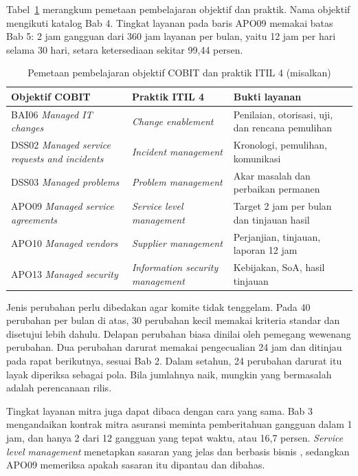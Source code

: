 Tabel~\ref{tab:ch08-itil} merangkum pemetaan pembelajaran objektif dan praktik. Nama objektif
mengikuti katalog Bab 4. Tingkat layanan pada baris APO09 memakai batas Bab 5: 2 jam gangguan dari
360 jam layanan per bulan, yaitu 12 jam per hari selama 30 hari, setara ketersediaan sekitar 99,44
persen.

\begin{table}[!htb]
  \centering\small
  \caption{Pemetaan pembelajaran objektif COBIT dan praktik ITIL 4 (misalkan)}\label{tab:ch08-itil}
  \begin{tabularx}{\textwidth}{|>{\raggedright\arraybackslash}p{}|>{\raggedright\arraybackslash}p{}|>{\raggedright\arraybackslash}X|}
    \hline
    \textbf{Objektif COBIT} & \textbf{Praktik ITIL 4} & \textbf{Bukti layanan} \\ \hline
    BAI06 \textit{Managed IT changes} & \textit{Change enablement} & Penilaian, otorisasi, uji, dan
    rencana pemulihan \\ \hline
    DSS02 \textit{Managed service requests and incidents} & \textit{Incident management} &
    Kronologi, pemulihan, komunikasi \\ \hline
    DSS03 \textit{Managed problems} & \textit{Problem management} & Akar masalah dan perbaikan
    permanen \\ \hline
    APO09 \textit{Managed service agreements} & \textit{Service level management} & Target 2 jam
    per bulan dan tinjauan hasil \\ \hline
    APO10 \textit{Managed vendors} & \textit{Supplier management} & Perjanjian, tinjauan, laporan
    12 jam \\ \hline
    APO13 \textit{Managed security} & \textit{Information security management} & Kebijakan, SoA,
    hasil tinjauan \\ \hline
  \end{tabularx}
\end{table}

Jenis perubahan perlu dibedakan agar komite tidak tenggelam. Pada 40 perubahan per bulan di atas,
30 perubahan kecil memakai kriteria standar dan disetujui lebih dahulu. Delapan perubahan biasa
dinilai oleh pemegang wewenang perubahan. Dua perubahan darurat memakai pengecualian 24 jam dan
ditinjau pada rapat berikutnya, sesuai Bab 2. Dalam setahun, 24 perubahan darurat itu layak
diperiksa sebagai pola. Bila jumlahnya naik, mungkin yang bermasalah adalah perencanaan rilis.

Tingkat layanan mitra juga dapat dibaca dengan cara yang sama. Bab 3 mengandaikan kontrak mitra
asuransi meminta pemberitahuan gangguan dalam 1 jam, dan hanya 2 dari 12 gangguan yang tepat waktu,
atau 16,7 persen. \textit{Service level management} menetapkan sasaran yang jelas dan berbasis
bisnis \cite{c08-peoplecert-modul}, sedangkan APO09 memeriksa apakah sasaran itu dipantau dan
dibahas.

